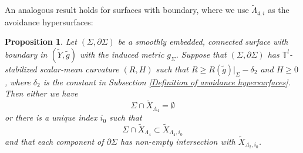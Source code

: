 \documentclass[11pt,letterpaper]{amsart}
\numberwithin{equation}{section}
\newtheorem{proposition}[theorem]{Proposition}
\theoremstyle{definition}
\begin{document}
An analogous result holds for surfaces with boundary, where we use  $\tilde{\Lambda}_{4,i}$ as the avoidance hypersurfaces:
\begin{proposition}\label{Prop: compact}
Let $(\Sigma,\partial\Sigma)$ be a smoothly embedded, connected surface with boundary in $(\tilde Y,\tilde g)$ with the induced metric $g_\Sigma$. Suppose that $(\Sigma,\partial\Sigma)$ has $\mathbb T^l$-stabilized scalar-mean curvature $(R,H)$ such that $R\geq R(\tilde g)|_{\Sigma}-\delta_2$ and $H\geq 0$, where $\delta_{2}$ is the constant in Subsection \ref{Definition of avoidance hypersurfaces}. Then either we have
$$\Sigma\cap \tilde X_{\Lambda_{4}}=\emptyset$$
or there is a unique index $i_0$ such that
$$\Sigma\cap\tilde X_{\Lambda_{4}}\subset \tilde X_{\Lambda_4,i_0}$$
and that each component of $\partial\Sigma$ has non-empty intersection with $\tilde X_{\Lambda_2,i_0}$.
\end{proposition}
\end{document}
